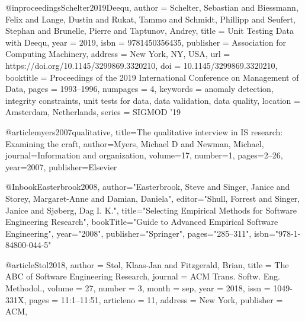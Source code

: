 @inproceedings{Schelter2019Deequ,
author = {Schelter, Sebastian and Biessmann, Felix and Lange, Dustin and Rukat, Tammo and Schmidt, Phillipp and Seufert, Stephan and Brunelle, Pierre and Taptunov, Andrey},
title = {Unit Testing Data with Deequ},
year = {2019},
isbn = {9781450356435},
publisher = {Association for Computing Machinery},
address = {New York, NY, USA},
url = {https://doi.org/10.1145/3299869.3320210},
doi = {10.1145/3299869.3320210},
booktitle = {Proceedings of the 2019 International Conference on Management of Data},
pages = {1993–1996},
numpages = {4},
keywords = {anomaly detection, integrity constraints, unit tests for data, data validation, data quality},
location = {Amsterdam, Netherlands},
series = {SIGMOD '19}
}




@article{myers2007qualitative,
  title={The qualitative interview in IS research: Examining the craft},
  author={Myers, Michael D and Newman, Michael},
  journal={Information and organization},
  volume={17},
  number={1},
  pages={2--26},
  year={2007},
  publisher={Elsevier}
}

@Inbook{Easterbrook2008,
author="Easterbrook, Steve
and Singer, Janice
and Storey, Margaret-Anne
and Damian, Daniela",
editor="Shull, Forrest
and Singer, Janice
and Sj{\o}berg, Dag I. K.",
title="Selecting Empirical Methods for Software Engineering Research",
bookTitle="Guide to Advanced Empirical Software Engineering",
year="2008",
publisher="Springer",
pages="285--311",
isbn="978-1-84800-044-5"
}


@article{Stol2018,
 author = {Stol, Klaas-Jan and Fitzgerald, Brian},
 title = {The ABC of Software Engineering Research},
 journal = {ACM Trans. Softw. Eng. Methodol.},
 volume = {27},
 number = {3},
 month = sep,
 year = {2018},
 issn = {1049-331X},
 pages = {11:1--11:51},
 articleno = {11},
  address = {New York},
 publisher = {ACM},
} 



